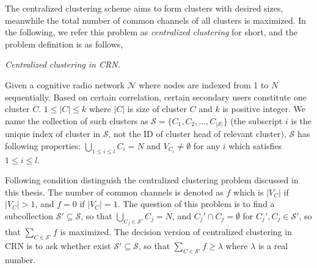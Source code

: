 

The centralized clustering scheme aims to form clusters with desired sizes, meanwhile the total number of common channels of all clusters is maximized.
In the following, we refer this problem as \textit{centralized clustering} for short, and the problem definition is as follows, 


\begin{mydef}
\label{def_centralized_clustering}
\textit{Centralized clustering in CRN.}

Given a cognitive radio network $\mathcal{N}$ where nodes are indexed from 1 to $N$ sequentially.
Based on certain correlation, certain secondary users constitute one cluster $C$.
$1\leq |C| \leqslant k$ where $|C|$ is size of cluster $C$ and $k$ is positive integer.
We name the collection of such clusters as $\mathcal{S}=\{C_1, C_2,\ldots,C_{|\mathcal{S}|}\}$ (the subscript $i$ is the unique index of cluster in $\mathcal{S}$, not the ID of cluster head of relevant cluster), $\mathcal{S}$ has following properties: $\bigcup_{1\leq i \leq l} C_i = N$ and $V_{C_i}\neq \emptyset$ for any $i$ which satisfies $1\leq i \leq l$.

Following condition distinguish the centralized clustering problem discussed in this thesis.
The number of common channels is denoted as $f$ which is $|V_{C}|$ if $|V_{C}|>1$, and $f=0$ if $|V_{C}|=1$.
The question of this problem is to find a subcollection $\mathcal{S}' \subseteq \mathcal{S}$, so that $\bigcup_{C_j\in \mathcal{S}'} C_j = N$, and $C_j'\cap C_j =\emptyset$ for $C_j', C_j\in \mathcal{S}'$, so that $\sum_{C\in \mathcal{S}'} f$ is maximized.
The decision version of centralized clustering in CRN is to ask whether exist $\mathcal{S}'\subseteq \mathcal{S}$, so that $\sum_{C\in \mathcal{S}'} f \geqslant \lambda$ where $\lambda$ is a real number.%
\end{mydef}


